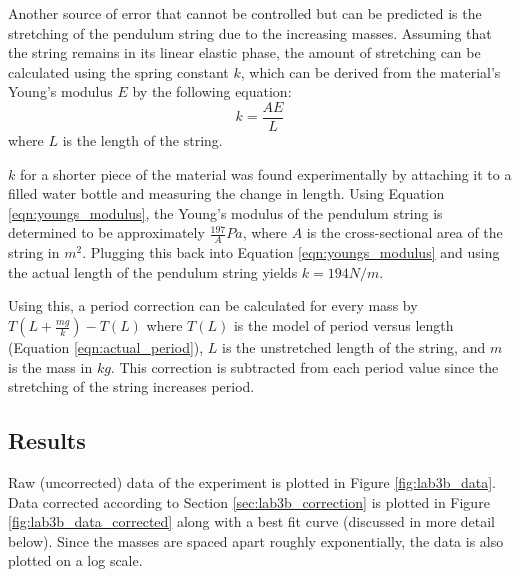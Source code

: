 \documentclass[aps,twocolumn,secnumarabic,nobalancelastpage,amsmath,amssymb,nofootinbib,floatfix,letterpaper]{revtex4}
\begin{document}
Another source of error that cannot be controlled but can be predicted is the stretching of the pendulum string due to
the increasing masses. Assuming that the string remains in its linear elastic phase, the amount of stretching can be
calculated using the spring constant \(k\), which can be derived from the material's Young's modulus \(E\) by the
following equation: \cite{civ_notes}
\begin{equation}
    k = \frac{AE}{L}
    \label{eqn:youngs_modulus}
\end{equation}
where \(L\) is the length of the string.

\(k\) for a shorter piece of the material was found experimentally by attaching it to a filled water bottle and
measuring the change in length. Using Equation \ref{eqn:youngs_modulus}, the Young's modulus of the pendulum string is
determined to be approximately \(\frac{197}{A}\si{Pa}\), where \(A\) is the cross-sectional area of the string in \(\si{m^2}\).
Plugging this back into Equation \ref{eqn:youngs_modulus} and using the actual length of the pendulum string yields
\(k = 194\si{N/m}\).

Using this, a period correction can be calculated for every mass by \(T(L + \frac{mg}{k}) - T(L)\) where \(T(L)\) is the
model of period versus length (Equation \ref{eqn:actual_period}), \(L\) is the unstretched length of the string, and
\(m\) is the mass in \(\si{kg}\). This correction is subtracted from each period value since the stretching of the
string increases period.

\subsection{Results}

Raw (uncorrected) data of the experiment is plotted in Figure \ref{fig:lab3b_data}. Data corrected according to Section
\ref{sec:lab3b_correction} is plotted in Figure \ref{fig:lab3b_data_corrected} along with a best fit curve (discussed in
more detail below). Since the masses are spaced apart roughly exponentially, the data is also plotted on a log scale.
\end{document}
